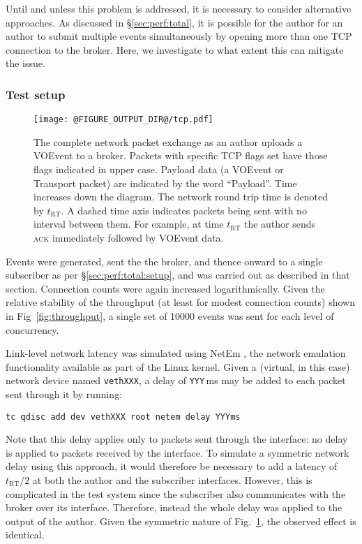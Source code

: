 \documentclass[5p,authoryear]{elsarticle}
\begin{document}
Until and unless this problem is addressed, it is necessary to consider
alternative approaches. As discussed in \S\ref{sec:perf:total}, it is possible
for the author for an author to submit multiple events simultaneously by
opening more than one TCP connection to the broker. Here, we investigate to
what extent this can mitigate the issue.

\subsubsection{Test setup}

\begin{figure}
  \begin{center}
  \texttt{[image: @FIGURE\_OUTPUT\_DIR@/tcp.pdf]}
  \end{center}

  \caption{The complete network packet exchange as an author uploads a VOEvent
  to a broker. Packets with specific TCP flags set have those flags indicated
  in upper case. Payload data (a VOEvent or Transport packet) are indicated
  by the word ``Payload''. Time increases down the diagram. The network round
  trip time is denoted by $t_\mathrm{RT}$. A dashed time axis indicates
  packets being sent with no interval between them. For example, at time
  $t_\mathrm{RT}$ the author sends \textsc{ack} immediately followed by
  VOEvent data.}

  \label{fig:tcp}
\end{figure}

Events were generated, sent the the broker, and thence onward to a single
subscriber as per \S\ref{sec:perf:total:setup}, and was carried out as
described in that section. Connection counts were again increased
logarithmically.  Given the relative stability of the throughput (at least for
modest connection counts) shown in Fig~\ref{fig:throughput}, a single set of
10000 events was sent for each level of concurrency.

Link-level network latency was simulated using NetEm \citep{Hemminger:2005},
the network emulation functionality available as part of the Linux kernel.
Given a (virtual, in this case) network device named \texttt{vethXXX}, a
delay of \texttt{YYY}\,ms may be added to each packet sent through it by
running:
\begin{verbatim}
tc qdisc add dev vethXXX root netem delay YYYms
\end{verbatim}
Note that this delay applies only to packets sent through the interface: no
delay is applied to packets received by the interface. To simulate a symmetric
network delay using this approach, it would therefore be necessary to add a
latency of $t_\mathrm{RT} / 2$ at both the author and the subscriber
interfaces. However, this is complicated in the test system since the
subscriber also communicates with the broker over its interface. Therefore,
instead the whole delay was applied to the output of the author. Given the
symmetric nature of Fig.~\ref{fig:tcp}, the observed effect is identical.
\end{document}
